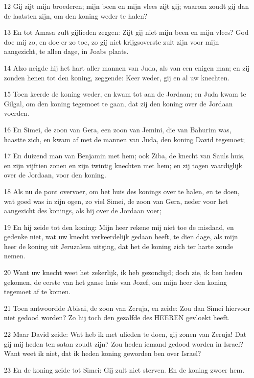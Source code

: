 \par 12 Gij zijt mijn broederen; mijn been en mijn vlees zijt gij; waarom zoudt gij dan de laatsten zijn, om den koning weder te halen?
\par 13 En tot Amasa zult gijlieden zeggen: Zijt gij niet mijn been en mijn vlees? God doe mij zo, en doe er zo toe, zo gij niet krijgsoverste zult zijn voor mijn aangezicht, te allen dage, in Joabs plaats.
\par 14 Alzo neigde hij het hart aller mannen van Juda, als van een enigen man; en zij zonden henen tot den koning, zeggende: Keer weder, gij en al uw knechten.
\par 15 Toen keerde de koning weder, en kwam tot aan de Jordaan; en Juda kwam te Gilgal, om den koning tegemoet te gaan, dat zij den koning over de Jordaan voerden.
\par 16 En Simei, de zoon van Gera, een zoon van Jemini, die van Bahurim was, haastte zich, en kwam af met de mannen van Juda, den koning David tegemoet;
\par 17 En duizend man van Benjamin met hem; ook Ziba, de knecht van Sauls huis, en zijn vijftien zonen en zijn twintig knechten met hem; en zij togen vaardiglijk over de Jordaan, voor den koning.
\par 18 Als nu de pont overvoer, om het huis des konings over te halen, en te doen, wat goed was in zijn ogen, zo viel Simei, de zoon van Gera, neder voor het aangezicht des konings, als hij over de Jordaan voer;
\par 19 En hij zeide tot den koning: Mijn heer rekene mij niet toe de misdaad, en gedenke niet, wat uw knecht verkeerdelijk gedaan heeft, te dien dage, als mijn heer de koning uit Jeruzalem uitging, dat het de koning zich ter harte zoude nemen.
\par 20 Want uw knecht weet het zekerlijk, ik heb gezondigd; doch zie, ik ben heden gekomen, de eerste van het ganse huis van Jozef, om mijn heer den koning tegemoet af te komen.
\par 21 Toen antwoordde Abisai, de zoon van Zeruja, en zeide: Zou dan Simei hiervoor niet gedood worden? Zo hij toch den gezalfde des HEEREN gevloekt heeft.
\par 22 Maar David zeide: Wat heb ik met ulieden te doen, gij zonen van Zeruja! Dat gij mij heden ten satan zoudt zijn? Zou heden iemand gedood worden in Israel? Want weet ik niet, dat ik heden koning geworden ben over Israel?
\par 23 En de koning zeide tot Simei: Gij zult niet sterven. En de koning zwoer hem.
